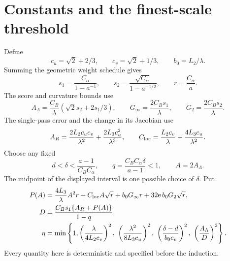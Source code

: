 \documentclass[11pt]{article}
\theoremstyle{remark}
\begin{document}
\appendix
\section{Constants and the finest-scale threshold}\label{app:constants}
Define
\[
 c_u=\sqrt2+2/3,\qquad c_v=\sqrt2+1/3,\qquad b_0=L_2/\lambda.
\]
Summing the geometric weight schedule gives
\[
 s_1=\frac{C_\alpha}{1-a^{-1}},\qquad
 s_2=\frac{\sqrt{C_\alpha}}{1-a^{-1/2}},\qquad r=\frac{C_\alpha}{a}.
\]
The score and curvature bounds use
\[
 A_\Lambda=\frac{C_B}{\lambda}(\sqrt2s_2+2s_1/3),\qquad
 G_\infty=\frac{2C_Bs_1}{\lambda},\qquad G_2=\frac{2C_Bs_2}{\lambda}.
\]
The single-pass error and the change in its Jacobian use
\[
 A_R=\frac{2L_2c_uc_v}{\lambda^2}+\frac{2L_3c_u^2}{\lambda^3},
 \qquad C_{\rm loc}=\frac{L_2c_v}{\lambda}+\frac{4L_3c_u}{\lambda^2}.
\]
Choose any fixed
\[
 d<\delta<\frac{a-1}{C_BC_\alpha},\qquad
 q=\frac{C_BC_\alpha\delta}{a-1}<1,\qquad A=2A_\Lambda .
\]
The midpoint of the displayed interval is one possible choice of \(\delta\).
Put
\begin{align}
 P(A)&=\frac{4L_3}{\lambda}A^2r+C_{\rm loc}A\sqrt r
          +b_0G_\infty r+32\mathrm e\,b_0G_2\sqrt r,\label{eq:P}\\
 D&=\frac{C_Bs_1\{A_R+P(A)\}}{1-q},\label{eq:D}\\
 \eta&=\min\left\{1,
   \left(\frac{\lambda}{4L_2c_v}\right)^2,\
   \left(\frac{\lambda^2}{8L_3c_u}\right)^2,\
   \left(\frac{\delta-d}{b_0c_v}\right)^2,\
   \left(\frac{A_\Lambda}{D}\right)^2\right\}.\label{eq:eta}
\end{align}
Every quantity here is deterministic and specified before the induction.
\end{document}
